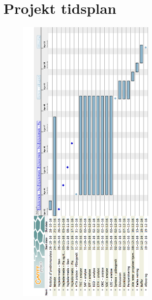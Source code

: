 \chapter{Projekt tidsplan}
\begin{figure}[H] 
	\begin{center}
		\includegraphics[width=0.6\textwidth]{../figures/cMetode/Projekt_tidsplan}
	\end{center}
	\label{fig:tidsplan} 
\end{figure} \vspace{-.50cm}

\begingroup
\label{litteraturliste}
\raggedright


\endgroup







